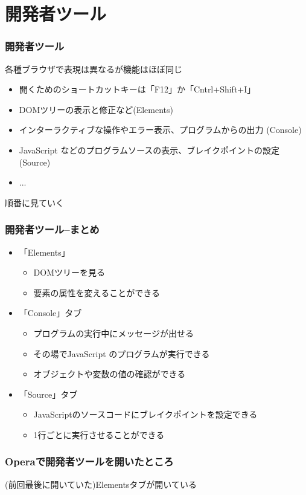 \section{開発者ツール}
\begin{frame}[containsverbatim]
 \frametitle{開発者ツール}
 各種ブラウザで表現は異なるが機能はほぼ同じ
 \begin{itemize}
  \item 開くためのショートカットキーは「F12」か「Cntrl+Shift+I」
  \item DOMツリーの表示と修正など(Elements)
  \item インターラクティブな操作やエラー表示、プログラムからの出力
        (Console)
  \item JavaScript などのプログラムソースの表示、ブレイクポイントの設定
        (Source)
  \item ...
 \end{itemize}
 順番に見ていく
\end{frame}
\begin{frame}
 \frametitle{開発者ツール--まとめ}
\begin{itemize}
 \item  「Elements」
 \begin{itemize}
	\item DOMツリーを見る
	\item 要素の属性を変えることができる
 \end{itemize}
 \item 「Console」タブ
 \begin{itemize}
	\item プログラムの実行中にメッセージが出せる
	\item その場でJavaScript のプログラムが実行できる
	\item オブジェクトや変数の値の確認ができる
 \end{itemize}
 \item 「Source」タブ
 \begin{itemize}
	\item JavaScriptのソースコードにブレイクポイントを設定できる
	\item 1行ごとに実行させることができる
 \end{itemize}
			 \end{itemize}
\end{frame}
\iffalse
\begin{frame}[containsverbatim]
 \frametitle{Operaで開発者ツールを開いたところ}
 (前回最後に開いていた)Elementsタブが開いている
\end{frame}
